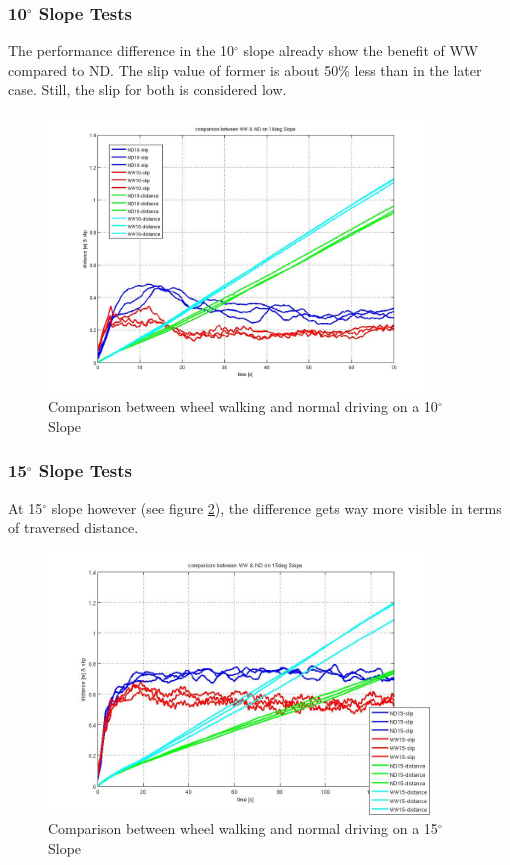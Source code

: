 \documentclass[a4paper,twocolumn]{esapub2005} %
\begin{document}
\subsubsection*{10$^{\circ}$ Slope Tests}
The performance difference in the 10$^\circ$ slope already show the benefit of WW compared to ND. The slip value of former is about 50\% less than in the later case. Still, the slip for both is considered low.

\begin{figure}[h!]
    \centering
    \includegraphics[width=0.9\textwidth]{10d.jpg}	\caption{Comparison between
    wheel walking and normal driving on a 10$^{\circ}$ Slope} \label{fig:10d}
\end{figure}

\subsubsection*{15$^{\circ}$ Slope Tests}
At 15$^\circ$ slope however (see figure \ref{fig:15d}), the difference gets way
more visible in terms of traversed distance.  

\begin{figure}[h!]
    \centering
    \includegraphics[width=0.9\textwidth]{15d.jpg}	\caption{Comparison between
    wheel walking and normal driving on a 15$^{\circ}$ Slope} \label{fig:15d}
\end{figure}
\end{document}
